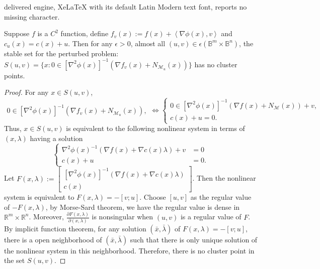 \documentclass[10pt,a4paper]{amsart}
\def\inner#1{\left\langle#1\right\rangle}
\newcommand{\R}{\mathbb R}
\begin{document}
delivered engine, XeLaTeX with its default Latin Modern text font, reports no missing character.
\begin{lemma}
\label{le:perturb}
Suppose $f$ is a $C^2$ function, define $f_v(x):=f(x)+\inner{\nabla\phi(x),v}$ and $c_u(x)=c(x)+u$. Then for any $\epsilon>0$, almost all $(u,v)\in\epsilon(\mathbb{B}^m\times\mathbb{B}^n)$, the stable set for the perturbed problem: $S(u,v)=\{x:0\in [\nabla^2\phi(x)]^{-1} (\nabla f_v(x)+N_{\mathcal{M}_u}(x))\}$ has no cluster points. 
\end{lemma}

\begin{proof}
For any $x\in S(u,v)$, 
\[
\begin{aligned}
0\in [\nabla^2\phi(x)]^{-1}  (\nabla f_v(x)+N_{\mathcal{M}_u}(x)),
\end{aligned}
\Longleftrightarrow 
\left\{
\begin{aligned}
0\in [\nabla^2\phi(x)]^{-1}  (\nabla f(x)+N_{\mathcal{M}}(x))+v,\\
c(x)+u=0.
\end{aligned}
\right.
\]
Thus, $x\in S(u,v)$ is equivalent to the following nonlinear system in terms of $(x,\lambda)$ having a solution 
\[
\left\{
\begin{aligned}
\nabla^2\phi(x)^{-1}  (\nabla f(x)+\nabla c(x)\lambda)+v&=0\\
c(x)+u&=0.
\end{aligned}
\right.
\]
Let $F(x,\lambda):=\left[
\begin{array}{c}
   [\nabla^2\phi(x)]^{-1} (\nabla f(x)+\nabla c(x)\lambda)  \\
   c(x)  
\end{array}
\right]$. Then the nonlinear system is equivalent to $F(x,\lambda)=-[v;u]$. Choose $[u,v]$ as the regular value of $-F(x,\lambda)$, by Morse-Sard theorem, we have the regular value is dense in $\R^{m}\times\R^n$. Moreover, $\frac{\partial F(x,\lambda)}{\partial (x,\lambda)}$ is nonsingular when $(u,v)$ is a regular value of $F$. By implicit function theorem, for any solution $(\bar x,\bar\lambda)$ of $F(x,\lambda)=-[v;u]$, there is a open neighborhood of $(\bar x,\bar\lambda)$ such that there is only unique solution of the nonlinear system in this neighborhood. Therefore, there is no cluster point in the set $S(u,v)$.
\end{proof}
\end{document}
